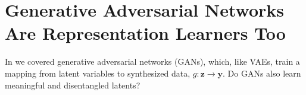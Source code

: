






\section{Generative Adversarial Networks Are Representation Learners Too}
In \chap{\ref{chapter:generative_models}} we covered generative adversarial networks (GANs), which, like VAEs, train a mapping from latent variables to synthesized data, $g: \mathbf{z} \rightarrow \mathbf{y}$. Do GANs also learn meaningful and disentangled latents?

